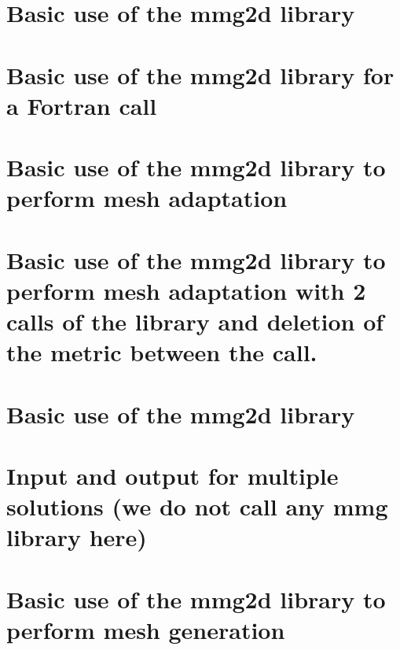 \documentclass[twoside]{book}
\newcommand{\+}{\discretionary{\mbox{\scriptsize$\hookleftarrow$}}{}{}}
\begin{document}
\chapter{Basic use of the mmg2d library}
\label{md_libexamples_mmg2d_adaptation_example0_README}

\chapter{Basic use of the mmg2d library for a Fortran call}
\label{md_libexamples_mmg2d_adaptation_example0_fortran_README}

\chapter{Basic use of the mmg2d library to perform mesh adaptation}
\label{md_libexamples_mmg2d_adaptation_example1_README}

\chapter{Basic use of the mmg2d library to perform mesh adaptation with 2 calls of the library and deletion of the metric between the call.}
\label{md_libexamples_mmg2d_adaptation_example2_README}

\chapter{Basic use of the mmg2d library}
\label{md_libexamples_mmg2d_adaptation_example3_README}

\chapter{Input and output for multiple solutions (we do not call any mmg library here)}
\label{md_libexamples_mmg2d_io_multisols_example0_README}

\chapter{Basic use of the mmg2d library to perform mesh generation}
\label{md_libexamples_mmg2d_squareGeneration_example0_README}

\end{document}
